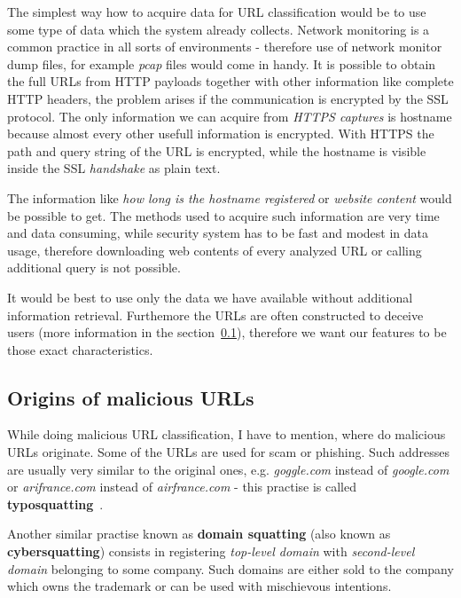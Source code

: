 The simplest way how to acquire data for URL classification would be to use some type of data which the system already collects.
Network monitoring is a common practice in all sorts of environments - therefore use of network monitor dump files, for example \textit{pcap} files would come in handy.
It is possible to obtain the full URLs from HTTP payloads together with other information like complete HTTP headers, the problem arises if the communication is encrypted by the SSL protocol.
The only information we can acquire from \textit{HTTPS captures} is hostname because almost every other usefull information is encrypted.
With HTTPS the path and query string of the URL is encrypted, while the hostname is visible inside the SSL \textit{handshake} as plain text.

The information like \textit{how long is the hostname registered} or \textit{website content} would be possible to get.
The methods used to acquire such information are very time and data consuming, while security system has to be fast and modest in data usage, therefore downloading web contents of every analyzed URL or calling additional query is not possible.

It would be best to use only the data we have available without additional information retrieval.
Furthemore the URLs are often constructed to deceive users (more information in the section~\ref{subsec:origins-of-malicious-urls}), therefore we want our features to be those exact characteristics.

\subsection{Origins of malicious URLs}\label{subsec:origins-of-malicious-urls}

While doing malicious URL classification, I have to mention, where do malicious URLs originate.
Some of the URLs are used for scam or phishing.
Such addresses are usually very similar to the original ones, e.g. \textit{goggle.com} instead of \textit{google.com} or \textit{arifrance.com} instead of \textit{airfrance.com} - this practise is called \textbf{typosquatting}~\cite{towards_data_science_phishing_url}.



Another similar practise known as \textbf{domain squatting} (also known as \textbf{cybersquatting}) consists in registering \textit{top-level domain} with \textit{second-level domain} belonging to some company.
Such domains are either sold to the company which owns the trademark or can be used with mischievous intentions.

